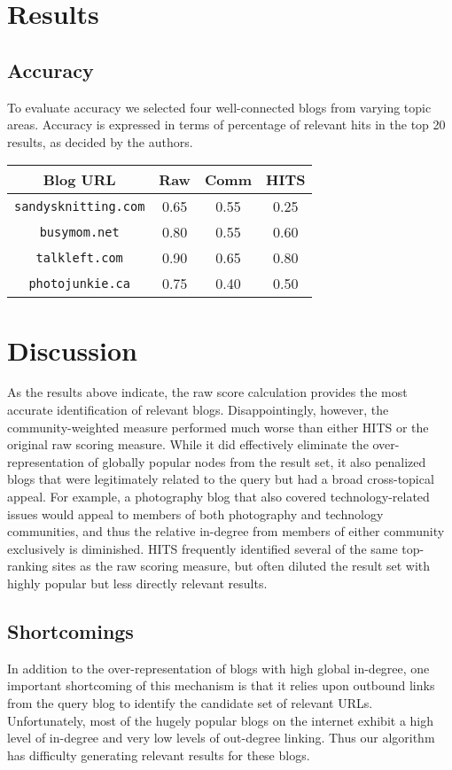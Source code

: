 \documentclass{sig-alternate}
\begin{document}
\section{Results}
\subsection{Accuracy}
To evaluate accuracy we selected four well-connected blogs from
varying topic areas. Accuracy is expressed in terms of percentage of
relevant hits in the top 20 results, as decided by the authors.


\begin{tabular}{|c|c|c|c|}
\hline
Blog URL & Raw & Comm & HITS \\
\hline
\texttt{sandysknitting.com} & 0.65 & 0.55 & 0.25 \\
\texttt{busymom.net} & 0.80 & 0.55 & 0.60 \\
\texttt{talkleft.com} & 0.90 & 0.65 & 0.80 \\
\texttt{photojunkie.ca} & 0.75 & 0.40 & 0.50 \\
\hline
\end{tabular}

\section{Discussion}
As the results above indicate, the raw score calculation provides the
most accurate identification of relevant blogs.  Disappointingly,
however, the community-weighted measure performed much worse than
either HITS or the original raw scoring measure.  While it did
effectively eliminate the over-representation of globally popular
nodes from the result set, it also penalized blogs that were
legitimately related to the query but had a broad cross-topical
appeal.  For example, a photography blog that also covered
technology-related issues would appeal to members of both photography
and technology communities, and thus the relative in-degree from
members of either community exclusively is diminished.  HITS
frequently identified several of the same top-ranking sites as the raw
scoring measure, but often diluted the result set with highly popular
but less directly relevant results.

\subsection{Shortcomings}
In addition to the over-representation of blogs with high global
in-degree, one important shortcoming of this mechanism is that it
relies upon outbound links from the query blog to identify the
candidate set of relevant URLs.  Unfortunately, most of the hugely
popular blogs on the internet exhibit a high level of in-degree and
very low levels of out-degree linking.  Thus our algorithm has
difficulty generating relevant results for these blogs.
\end{document}
